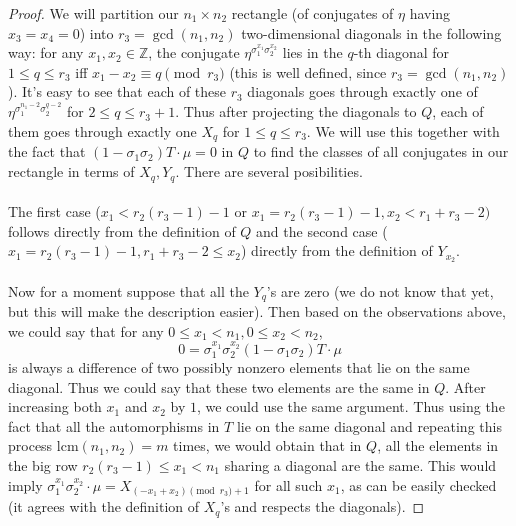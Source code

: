 \documentclass[12pt,a4paper]{article}
\theoremstyle{definition}
\newcommand{\Z}{\mathbb{Z}}
\newcommand{\lcm}{\mathrm{lcm}}
\begin{document}
\begin{proof}

We will partition our $n_1\times n_2$ rectangle (of conjugates of $\eta$ having $x_3=x_4=0$) into $r_3=\gcd(n_1,n_2)$ two-dimensional diagonals in the following way: for any $x_1,x_2\in\Z$, the conjugate $\eta^{\sigma_1^{x_1}\sigma_2^{x_2}}$ lies in the $q$-th diagonal for $1\leq q\leq r_3$ iff $x_1-x_2\equiv q \pmod{r_3}$ (this is well defined, since $r_3=\gcd(n_1,n_2)$). It's easy to see that each of these $r_3$ diagonals goes through exactly one of $\eta^{\sigma_1^{n_1-2}\sigma_2^{q-2}}$ for $2\leq q\leq r_3+1$. %
Thus after projecting the diagonals to $Q$, each of them goes through exactly one $X_q$ for $1\leq q \leq r_3$.
We will use this together with the fact that $(1-\sigma_1\sigma_2)T\cdot \mu=0$ in $Q$ to find the classes of all conjugates in our rectangle in terms of $X_q,Y_q$. There are several posibilities.
 \paragraph*{}
The first case ($x_1<r_2(r_3-1)-1$ or  $x_1=r_2(r_3-1)-1, x_2< r_1+r_3-2)$ follows directly from the definition of $Q$ and the second case ($x_1=r_2(r_3-1)-1, r_1+r_3-2\leq x_2$) directly from the definition of $Y_{x_2}$.
 \paragraph*{}
Now for a moment suppose that all the $Y_q$'s are zero (we do not know that yet, but this will make the description easier). Then based on the observations above, we could say that for any $0\leq x_1< n_1, 0\leq x_2< n_2$, $$0=\sigma_1^{x_1}\sigma_2^{x_2}(1-\sigma_1\sigma_2)T\cdot \mu$$ is always a difference of two possibly nonzero elements %
that lie on the same diagonal. Thus we could say that these two elements are the same in $Q$. After increasing both $x_1$ and $x_2$ by $1$, we could use the same argument. Thus using the fact that all the automorphisms in $T$ lie on the same diagonal and repeating this process $\lcm(n_1,n_2)=m$ times, we would obtain that in $Q$, all the elements in the big row $r_2(r_3-1)\leq x_1<n_1$ sharing a diagonal are the same. This would imply $\sigma_1^{x_1}\sigma_2^{x_2}\cdot \mu=X_{(-x_1+x_2)\pmod{r_3}+1}$ for all such $x_1$, as can be easily checked (it agrees with the definition of $X_q$'s and respects the diagonals).

\end{proof}
\end{document}
